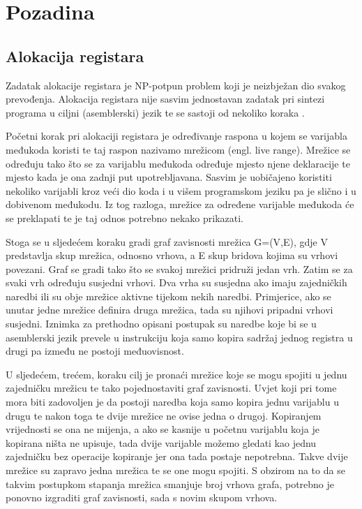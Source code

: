 \documentclass[hidelinks, conference]{IEEEtran}
\begin{document}
\section{Pozadina}

\subsection{Alokacija registara}

Zadatak alokacije registara je NP-potpun problem koji je neizbježan dio svakog prevođenja. Alokacija registara nije sasvim jednostavan zadatak pri sintezi programa u ciljni (asemblerski) jezik te se sastoji od nekoliko koraka \cite{b1}.

Početni korak pri alokaciji registara je određivanje raspona u kojem se varijabla međukoda koristi te taj raspon nazivamo mrežicom (engl. live range). Mrežice se određuju tako što se za varijablu međukoda određuje mjesto njene deklaracije te mjesto kada je ona zadnji put upotrebljavana. Sasvim je uobičajeno koristiti nekoliko varijabli kroz veći dio koda i u višem programskom jeziku pa je slično i u dobivenom međukodu. Iz tog razloga, mrežice za određene varijable međukoda će se preklapati te je taj odnos potrebno nekako prikazati.

Stoga se u sljedećem koraku gradi graf zavisnosti mrežica G=(V,E), gdje V predstavlja skup mrežica, odnosno vrhova, a E skup bridova kojima su vrhovi povezani. Graf se gradi tako što se svakoj mrežici pridruži jedan vrh. Zatim se za svaki vrh određuju susjedni vrhovi. Dva vrha su susjedna ako imaju zajedničkih naredbi ili su obje mrežice aktivne tijekom nekih naredbi. Primjerice, ako se unutar jedne mrežice definira druga mrežica, tada su njihovi pripadni vrhovi susjedni. Iznimka za prethodno opisani postupak su naredbe koje bi se u asemblerski jezik prevele u instrukciju koja samo kopira sadržaj jednog registra u drugi pa između ne postoji međuovisnost.

U sljedećem, trećem, koraku cilj je pronaći mrežice koje se mogu spojiti u jednu zajedničku mrežicu te tako pojednostaviti graf zavisnosti. Uvjet koji pri tome mora biti zadovoljen je da postoji naredba koja samo kopira jednu varijablu u drugu te nakon toga te dvije mrežice ne ovise jedna o drugoj. Kopiranjem vrijednosti se ona ne mijenja, a ako se kasnije u početnu varijablu koja je kopirana ništa ne upisuje, tada dvije varijable možemo gledati kao jednu zajedničku bez operacije kopiranje jer ona tada postaje nepotrebna. Takve dvije mrežice su zapravo jedna mrežica te se one mogu spojiti. S obzirom na to da se takvim postupkom stapanja mrežica smanjuje broj vrhova grafa, potrebno je ponovno izgraditi graf zavisnosti, sada s novim skupom vrhova.
\end{document}
